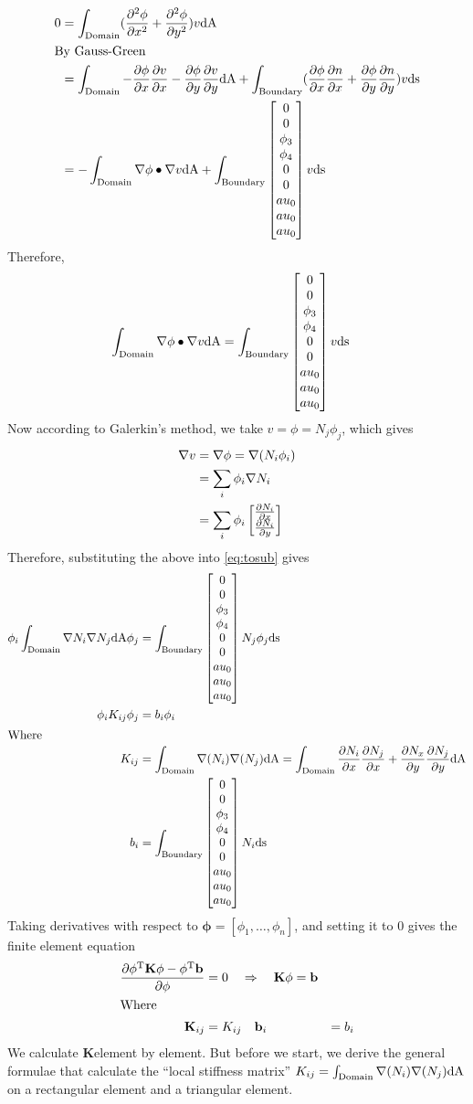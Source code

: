 \def\x{
  \ensuremath{\inta{\nabla \phi \bullet \nabla v}}
}
\def\y{
  \ensuremath{\intb{\phin v}}
}


\begin{align}
  0 &= \inta{(\dxx{\phi} + \dyy{\phi}) v} \notag\\
  \intertext{By Gauss-Green}
    &= \inta{-\dx{\phi}\dx{v} - \dy{\phi}\dy{v}} +
      \intb{
      (\dx{\phi}\dx{n} + \dy{\phi}\dy{n})v
      } \notag\\
    &= -\x + \y \notag
\end{align}
Therefore,
\begin{align}
  \x &= \y \label{eq:tosub}
\end{align}
Now according to Galerkin's method, we take $v = \phi = N_j\phi_j$, which gives
\begin{align}
  \nabla v &= \nabla \phi = \nabla (N_i \phi_i) \notag\\
           &= \sum_i \phi_i \nabla N_i \notag\\
  &= \sum_i \phi_i
    \begin{bmatrix}
      \frac{\partial N_i}{\partial x} \\ \frac{\partial N_i}{\partial y}
    \end{bmatrix} \notag
\end{align}
Therefore, substituting the above into \cref{eq:tosub} gives
\def\x{\ensuremath{\inta{\nabla (N_i)\nabla (N_j)}}}
\def\bi{\ensuremath{\intb{\phin N_i}}}
\begin{align}
  \phi_i \inta{\nabla N_i \nabla N_j} \phi_j &= \intb{\phin N_j \phi_j} \notag\\
  \phi_i K_{ij} \phi_j &= b_i \phi_i \notag\\
  \intertext{Where}
  K_{ij} &= \x = \inta{\dx{N_i}\dx{N_j} + \dy{N_x}\dy{N_j}} \notag\\
  b_i &= \bi \notag
\end{align}
Taking derivatives with respect to $\mathbf{\phi} = [\phi_1, \dotsc, \phi_n]$,
and setting it to 0 gives the finite element equation
\def\tr#1{\ensuremath{{#1}^{\text{T}}}}
\def\p{\mathbf{\phi}}
\begin{align}
  \dX[\p]{\tr{\p} \mathbf{K} \p - \tr{\p}\mathbf{b}} &= 0 \quad \Rightarrow \quad
                                                       \mathbf{K}\p = \mathbf{b}
                                                       \label{eq:fe} \\
  \intertext{Where}
  \mathbf{K}_{ij} &= K_{ij} \quad \mathbf{b}_{i} &= b_i \notag
\end{align}
\def\K{\ensuremath{\mathbf{K}}}
We calculate \K element by element. But before we start, we derive the general
formulae that calculate the ``local stiffness matrix'' $K_{ij} = \x $ on a
rectangular element and a triangular element.

